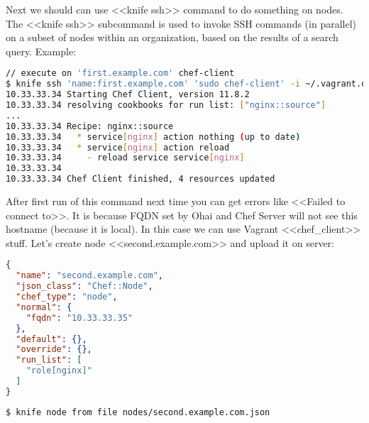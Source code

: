 Next we should can use <<knife ssh>> command to do something on nodes. The <<knife ssh>> subcommand is used to invoke SSH commands (in parallel) on a subset of nodes within an organization, based on the results of a search query. Example:

\begin{lstlisting}[language=Bash,label=lst:my-serer-cloud-role5]
// execute on 'first.example.com' chef-client
$ knife ssh 'name:first.example.com' 'sudo chef-client' -i ~/.vagrant.d/insecure_private_key -x vagrant
10.33.33.34 Starting Chef Client, version 11.8.2
10.33.33.34 resolving cookbooks for run list: ["nginx::source"]
...
10.33.33.34 Recipe: nginx::source
10.33.33.34   * service[nginx] action nothing (up to date)
10.33.33.34   * service[nginx] action reload
10.33.33.34     - reload service service[nginx]
10.33.33.34
10.33.33.34 Chef Client finished, 4 resources updated
\end{lstlisting}

After first run of this command next time you can get errors like <<Failed to connect to>>. It is because FQDN set by Ohai and Chef Server will not see this hostname (because it is local). In this case we can use Vagrant <<chef_client>> stuff. Let's create node <<second.example.com>> and upload it on server:

\begin{lstlisting}[language=JSON,label=lst:my-serer-cloud-role6,title=my-server-cloud/nodes/second.example.com.json]
{
  "name": "second.example.com",
  "json_class": "Chef::Node",
  "chef_type": "node",
  "normal": {
    "fqdn": "10.33.33.35"
  },
  "default": {},
  "override": {},
  "run_list": [
    "role[nginx]"
  ]
}
\end{lstlisting}

\begin{lstlisting}[language=Bash,label=lst:my-serer-cloud-role7]
$ knife node from file nodes/second.example.com.json
\end{lstlisting}